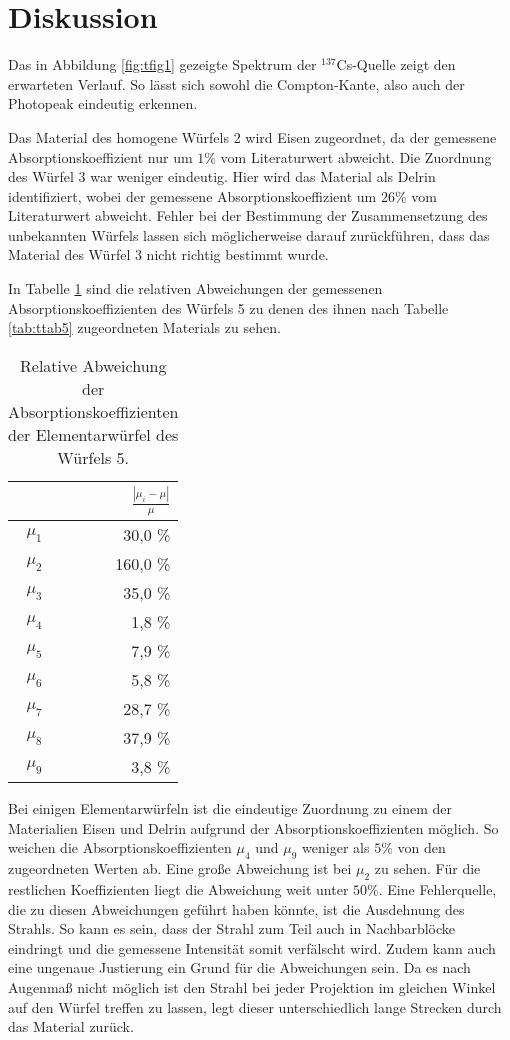 \section{Diskussion}
\label{sec:Diskussion}
Das in Abbildung \ref{fig:tfig1} gezeigte Spektrum der $^{137}$Cs-Quelle zeigt den erwarteten Verlauf.
So lässt sich sowohl die Compton-Kante, also auch der Photopeak eindeutig erkennen.

Das Material des homogene Würfels 2 wird Eisen zugeordnet, da der gemessene Absorptionskoeffizient nur um $1\%$ vom Literaturwert abweicht.
Die Zuordnung des Würfel 3 war weniger eindeutig.
Hier wird das Material als Delrin identifiziert, wobei der gemessene Absorptionskoeffizient um $26\%$ vom Literaturwert abweicht.
Fehler bei der Bestimmung der Zusammensetzung des unbekannten Würfels lassen sich möglicherweise darauf zurückführen, dass das Material des Würfel 3 nicht richtig bestimmt wurde.

In Tabelle \ref{tab:ttab6} sind die relativen Abweichungen der gemessenen Absorptionskoeffizienten des Würfels 5 zu denen des ihnen nach Tabelle \ref{tab:ttab5} zugeordneten Materials zu sehen.
\begin{table} 
    \caption{Relative Abweichung der Absorptionskoeffizienten der Elementarwürfel des Würfels 5.}
    \label{tab:ttab6}
    \centering
    \begin{tabular}{c | r}
    \toprule
        {} & {$\frac{|\mu_i-\mu|}{\mu}$} \\
        \midrule
        $\mu_1$ & 30,0 \% \\
        $\mu_2$ & 160,0 \% \\
        $\mu_3$ & 35,0 \% \\
        $\mu_4$ & 1,8 \% \\
        $\mu_5$ & 7,9 \% \\
        $\mu_6$ & 5,8 \% \\
        $\mu_7$ & 28,7 \% \\
        $\mu_8$ & 37,9 \% \\
        $\mu_9$ & 3,8 \% \\   
    \end{tabular}
    \end{table}

Bei einigen Elementarwürfeln ist die eindeutige Zuordnung zu einem der Materialien Eisen und Delrin aufgrund der Absorptionskoeffizienten möglich.
So weichen die Absorptionskoeffizienten $\mu_4$ und $\mu_9$ weniger als $5\%$ von den zugeordneten Werten ab.
Eine große Abweichung ist bei $\mu_2$ zu sehen.
Für die restlichen Koeffizienten liegt die Abweichung weit unter $50\%$.
Eine Fehlerquelle, die zu diesen Abweichungen geführt haben könnte, ist die Ausdehnung des Strahls.
So kann es sein, dass der Strahl zum Teil auch in Nachbarblöcke eindringt und die gemessene Intensität somit verfälscht wird.
Zudem kann auch eine ungenaue Justierung ein Grund für die Abweichungen sein.
Da es nach Augenmaß nicht möglich ist den Strahl bei jeder Projektion im gleichen Winkel auf den Würfel treffen zu lassen, legt dieser unterschiedlich lange Strecken durch das Material zurück.




